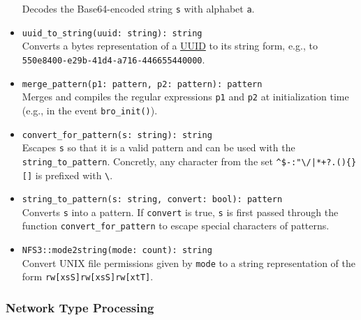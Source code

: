 \documentclass[10pt,landscape]{article}
\begin{document}
\begin{multicols*}{2}
\begin{itemize}
    Decodes the Base64-encoded string \verb|s| with alphabet \verb|a|.
  \item \verb|uuid_to_string(uuid: string): string|\\
    Converts a bytes representation of a
    \href{http://en.wikipedia.org/wiki/Universally_unique_identifier}{UUID} to
    its string form, e.g., to \verb|550e8400-e29b-41d4-a716-446655440000|.
  \item \verb|merge_pattern(p1: pattern, p2: pattern): pattern|\\
    Merges and compiles the regular expressions \verb|p1| and \verb|p2| at
    initialization time (e.g., in the event \verb|bro_init()|).
  \item \verb|convert_for_pattern(s: string): string|\\
    Escapes \verb|s| so that it is a valid pattern and can be used with the
    \verb|string_to_pattern|. Concretly, any character
    from the set \verb#^$-:"\/|*+?.(){}[]# is prefixed with \verb|\|.
  \item \verb|string_to_pattern(s: string, convert: bool): pattern|\\
    Converts \verb|s| into a pattern. If \verb|convert| is true, \verb|s| is
    first passed through the function \verb|convert_for_pattern| to escape
    special characters of patterns.
  \item \verb|NFS3::mode2string(mode: count): string|\\
    Convert UNIX file permissions given by \verb|mode| to a string
    representation of the form \verb|rw[xsS]rw[xsS]rw[xtT]|. 
\end{itemize}

\subsubsection*{Network Type Processing}


\end{multicols*}
\end{document}
